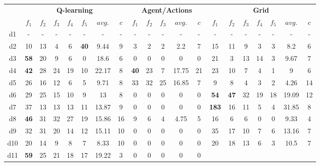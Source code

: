 
\setlength{\tabcolsep}{4pt}
\begin{tabular*}{\linewidth}{ @{\extracolsep{\fill}}c | ccccccc | ccccc | ccccccc @{}}
\toprule
& \multicolumn{7}{c|}{\textbf{Q-learning}} & \multicolumn{5}{c|}{\textbf{Agent/Actions}} & \multicolumn{7}{c}{\textbf{Grid}} \\

& $f_1$ & $f_2$  & $f_3$  & $f_4$ & $f_5$ & $avg.$ & $c$ 
& $f_1$ & $f_2$  & $f_3$  & $avg.$ & $c$
& $f_1$ & $f_2$  & $f_3$  & $f_4$ & $f_5$ & $avg.$ & $c$  \\
\midrule
d1 &  - & -  &  -  &  -  &  - &  -  &  - 
     & - & -  &  -  &  -  &  -   
    &  - & -  &  -  &  -  &  - &  -  &  -  \\
d2 &  10 & 13  &  4  &  6  &  \textbf{{\color{red}40}}  &  9.44  &  9
     & 3  & 2  &  2  &  2.2  &  7 
    &  15 &  11 &   9  &3 & 3 &  8.2  &  6  \\
d3 &  \textbf{{\color{red}58}} & 20  &  9  &  6  &  0 &  18.6  &  6
     & 0 & 0  &  0  &  0  &  0   
    &  21 & 3  &  13  &  14  &  3 &  9.67 &  7  \\
d4 &  \textbf{{\color{red}42}} & 28  &  24  & 19  &  10 &  22.17  &  8 
     & \textbf{{\color{red}40}} & 23  &  7  &  17.75  &  21   
    &  23 & 10  & 7  &  4  & 1 &  9  &  6  \\
d5 &  26 & 16  &  12  &  6  &  5 &  9.71  &  8
     & 33 & 32  &  25  &  16.85  &  7   
    &  9 & 8  &  4  &  3  &  2 &  4.26  &  14  \\
d6 &  29 & 25  &  15  &  10  &  9 &  13  &  8 
     & 0 & 0  &  0  &  0  &  0   
    &  \textbf{{\color{red}54}} & \textbf{{\color{red}47}}  &  32  &  19  &  18 &  19.09  &  12  \\
d7 &  37 & 13  &  13  &  13  &  11 &  13.87  &  9 
     & 0 & 0  &  0  &  0  &  0   
    &  \textbf{{\color{red}183}} & 16  &  11  &  5  &  4 &  31.85  &  8  \\
d8 &  \textbf{{\color{red}46}} & 31  &  32  &  27  &  19 &  15.86  &  16 
     & 9 & 6  &  4  &  4.75  &  5   
    &  16 & 6  &  6  &  0  &  0 &  9.33  &  4  \\
d9 &  32 & 31  &  20  &  14  &  12 &  15.11  &  10 
     & 0 & 0  &  0  &  0  &  0   
    &  35 & 17  &  10  &  7  &  6 &  13.16  &  7  \\
d10 &  20 & 14  &  9  &  8  &  7 &  8.33  &  10 
     & 0 & 0  &  0  &  0  &  0   
    &  20 & 18  &  13  &  6  &  3 &  10.5  &  7  \\
d11 &  \textbf{{\color{red}59}} & 25 & 21  &  18  &  17 &  19.22  &  3 
     & 0 & 0  &  0  &  0  &  0   

\end{tabular*}
